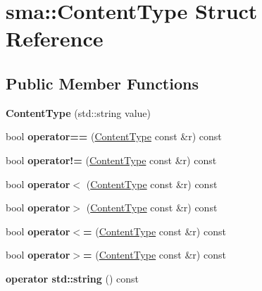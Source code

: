 \hypertarget{structsma_1_1ContentType}{\section{sma\-:\-:Content\-Type Struct Reference}
\label{structsma_1_1ContentType}
}
\subsection*{Public Member Functions}
\begin{DoxyCompactItemize}
\item 
\hypertarget{structsma_1_1ContentType_a7d23c0d130b7a08681f959ae78c54b29}{{\bfseries Content\-Type} (std\-::string value)}\label{structsma_1_1ContentType_a7d23c0d130b7a08681f959ae78c54b29}

\item 
\hypertarget{structsma_1_1ContentType_a4fe5d904675bae12d22c086319e534d0}{bool {\bfseries operator==} (\hyperlink{structsma_1_1ContentType}{Content\-Type} const \&r) const }\label{structsma_1_1ContentType_a4fe5d904675bae12d22c086319e534d0}

\item 
\hypertarget{structsma_1_1ContentType_af3237120b8772a43fe4e7021b729bcaa}{bool {\bfseries operator!=} (\hyperlink{structsma_1_1ContentType}{Content\-Type} const \&r) const }\label{structsma_1_1ContentType_af3237120b8772a43fe4e7021b729bcaa}

\item 
\hypertarget{structsma_1_1ContentType_aae340274f043e4739e09959cdf938ddd}{bool {\bfseries operator$<$} (\hyperlink{structsma_1_1ContentType}{Content\-Type} const \&r) const }\label{structsma_1_1ContentType_aae340274f043e4739e09959cdf938ddd}

\item 
\hypertarget{structsma_1_1ContentType_a267731f0fab65141d3ded72bc86073fc}{bool {\bfseries operator$>$} (\hyperlink{structsma_1_1ContentType}{Content\-Type} const \&r) const }\label{structsma_1_1ContentType_a267731f0fab65141d3ded72bc86073fc}

\item 
\hypertarget{structsma_1_1ContentType_a13d333cc3b49cc4f7ebaa5c548e1a743}{bool {\bfseries operator$<$=} (\hyperlink{structsma_1_1ContentType}{Content\-Type} const \&r) const }\label{structsma_1_1ContentType_a13d333cc3b49cc4f7ebaa5c548e1a743}

\item 
\hypertarget{structsma_1_1ContentType_aba39d4c5f587a79007970c737ee46c2b}{bool {\bfseries operator$>$=} (\hyperlink{structsma_1_1ContentType}{Content\-Type} const \&r) const }\label{structsma_1_1ContentType_aba39d4c5f587a79007970c737ee46c2b}

\item 
\hypertarget{structsma_1_1ContentType_a61ea9489436f81463d56d8b7e35b267b}{{\bfseries operator std\-::string} () const }\label{structsma_1_1ContentType_a61ea9489436f81463d56d8b7e35b267b}

\end{DoxyCompactItemize}
